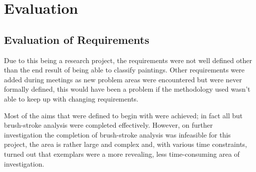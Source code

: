 \chapter{Evaluation}





\section{Evaluation of Requirements}
Due to this being a research project, the requirements were not well defined other than the end 
result of being able to classify paintings. Other requirements were added during meetings as new
problem areas were encountered but were never formally defined, this would have been a problem if 
the methodology used wasn't able to keep up with changing requirements.

Most of the aims that were defined to begin with were achieved; in fact all but brush-stroke 
analysis were completed effectively. However, on further investigation the completion of 
brush-stroke analysis was infeasible for this project, the area is rather large and complex and, 
with various time constraints, turned out that exemplars were a more revealing, less 
time-consuming area of investigation.



